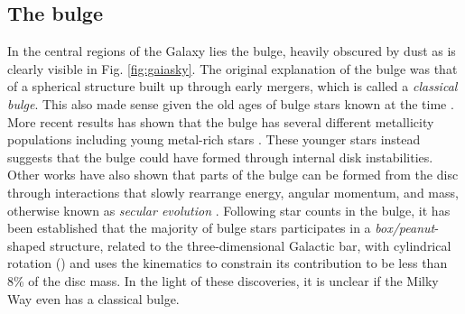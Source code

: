 \subsection{The bulge}\label{subsec:components-bulge}
In the central regions of the Galaxy lies the bulge, heavily obscured by dust as is clearly visible in Fig. \ref{fig:gaiasky}. The original explanation of the bulge was that of a spherical structure built up through early mergers, which is called a \textit{classical bulge}. This also made sense given the old ages of bulge stars known at the time \citep{clarkson:08}. More recent results has shown that the bulge has several different metallicity populations \citep{ness:13a} including young metal-rich stars \citep{ness:14}. These younger stars instead suggests that the bulge could have formed through internal disk instabilities. Other works have also shown that parts of the bulge can be formed from the disc through interactions that slowly rearrange energy, angular momentum, and mass, otherwise known as \textit{secular evolution} \citep{kormendy:13}. Following star counts in the bulge, it has been established that the majority of bulge stars participates in a \textit{box/peanut}-shaped structure, related to the three-dimensional Galactic bar, with cylindrical rotation (\citealt{wegg:13, ness:13b}) and \cite{shen:10} uses the kinematics to constrain its contribution to be less than 8\% of the disc mass. In the light of these discoveries, it is unclear if the Milky Way even has a classical bulge.

